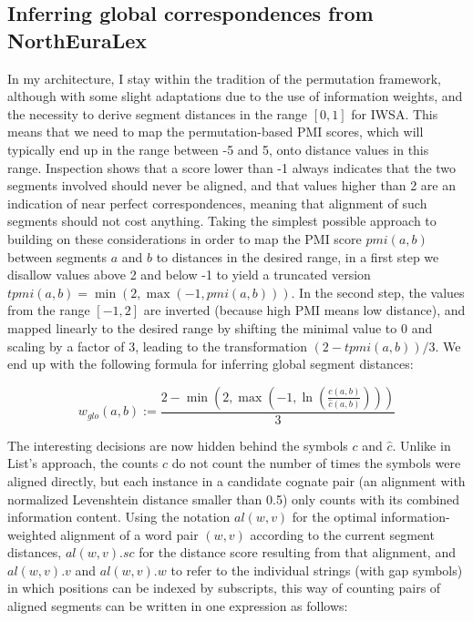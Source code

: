 \subsection{Inferring global correspondences from NorthEuraLex}
In my architecture, I stay within the tradition of the permutation framework, although with some slight adaptations due to the use of information weights, and the necessity to derive segment distances in the range $[0,1]$ for IWSA. This means that we need to map the permutation-based PMI scores, which will typically end up in the range between -5 and 5, onto distance values in this range. Inspection shows that a score lower than -1 always indicates that the two segments involved should never be aligned, and that values higher than 2 are an indication of near perfect correspondences, meaning that alignment of such segments should not cost anything. Taking the simplest possible approach to building on these considerations in order to map the PMI score $pmi(a,b)$ between segments $a$ and $b$ to distances in the desired range, in a first step we disallow values above 2 and below -1 to yield a truncated version $tpmi(a,b) = \min(2,\max(-1,pmi(a,b)))$. In the second step, the values from the range $[-1,2]$ are
inverted (because high PMI means low distance), and mapped linearly to the desired range by shifting the minimal value to $0$ and scaling by a factor of $3$, leading to the transformation $(2 - tpmi(a,b))/3$. We end up with the following formula for inferring global segment distances:

\begin{equation*}
w_{glo}(a,b) := \frac{2 - \min\left(2,\max\left(-1,\ln \left( \frac{c(a,b)}{\hat{c}(a,b)} \right)\right)\right)}{3}
\end{equation*}

The interesting decisions are now hidden behind the symbols $c$ and $\hat{c}$. Unlike in List's approach, the counts $c$ do not count the number of times the symbols were aligned directly, but each instance in a candidate cognate pair (an alignment with normalized Levenshtein distance smaller than 0.5) only counts with its combined information content. Using the notation $al(w,v)$ for the optimal information-weighted alignment of a word pair $(w,v)$ according to the current segment distances, $al(w,v).sc$ for the distance score resulting from that alignment, and $al(w,v).v$ and $al(w,v).w$ to refer to the individual strings (with gap symbols) in which positions can be indexed by subscripts, this way of counting pairs of aligned segments can be written in one expression as follows:

